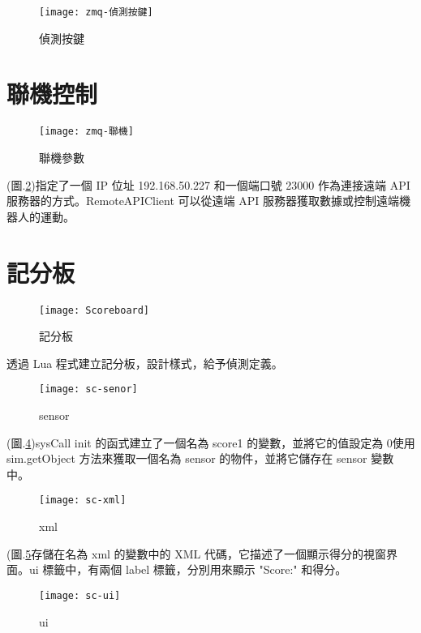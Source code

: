 \begin{figure}[hbt!]
\begin{center}
\texttt{[image: zmq-偵測按鍵]}
\caption{\Large 偵測按鍵}\label{zmq-偵測按鍵}
\end{center}
\end{figure}

\newpage
\section{聯機控制}
\begin{figure}[hbt!]
\begin{center}
\texttt{[image: zmq-聯機]}
\caption{\Large 聯機參數}\label{zmq-聯機}
\end{center}
\end{figure}
(圖.\ref{zmq-聯機})指定了一個 IP 位址 192.168.50.227 和一個端口號 23000 作為連接遠端 API 服務器的方式。RemoteAPIClient 可以從遠端 API 服務器獲取數據或控制遠端機器人的運動。\\
\newpage
\section{記分板}
\begin{figure}[hbt!]
\begin{center}
\texttt{[image: Scoreboard]}
\caption{\Large 記分板}\label{Scoreboard}
\end{center}
\end{figure}
透過 Lua 程式建立記分板，設計樣式，給予偵測定義。\\
\newpage
\begin{figure}[hbt!]
\begin{center}
\texttt{[image: sc-senor]}
\caption{\Large sensor}\label{sc-senor}
\end{center}
\end{figure}

(圖.\ref{sc-senor})sysCall init 的函式建立了一個名為 score1 的變數，並將它的值設定為 0使用 sim.getObject 方法來獲取一個名為 sensor 的物件，並將它儲存在 sensor 變數中。\\
\begin{figure}[hbt!]
\begin{center}
\texttt{[image: sc-xml]}
\caption{\Large xml}\label{sc-xml}
\end{center}
\end{figure}

(圖.\ref{sc-xml}存儲在名為 xml 的變數中的 XML 代碼，它描述了一個顯示得分的視窗界面。ui 標籤中，有兩個 label 標籤，分別用來顯示 "Score:" 和得分。\\
\begin{figure}[hbt!]
\begin{center}
\texttt{[image: sc-ui]}
\caption{\Large ui}\label{sc-ui}
\end{center}
\end{figure}

